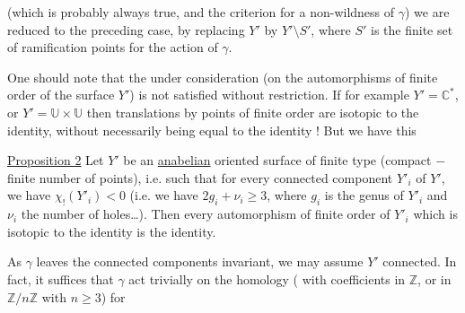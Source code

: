 (which is probably always true, and  the criterion for a non-wildness of $\gamma$) we are reduced to the preceding case, by  replacing $Y'$ by $Y'\setminus S'$, where $S'$ is the finite set of ramification points for the action of $\gamma$. 

One should note that the   under consideration  (on the automorphisms of finite order of the surface $Y'$) is not satisfied without restriction. If for example $Y'=\mathbb{C}^*$, or $Y'=\mathbb{U}\times\mathbb{U}$ then translations by points of finite order are isotopic to the identity, without necessarily being equal to the identity ! But we have this

\uline{Proposition 2} Let $Y'$ be an \uline{anabelian} oriented surface of finite type (compact  $-$ finite number of points), i.e. such that for every connected component $Y'_i$ of $Y'$, we have $\chi_!(Y'_i)<0$ (i.e. we have $2g_i+\nu_i\geq 3$, where $g_i$ is the genus of $Y'_i$ and $\nu_i$ the number of holes\ldots). Then every automorphism \inserted{$\gamma$} of finite order of $Y'_i$ which is isotopic to the identity is the identity.

As $\gamma$ leaves the connected components invariant, we may assume $Y'$ connected. In fact, it suffices that $\gamma$ act trivially on the homology  ( with coefficients in $\mathbb{Z}$, or in  $\mathbb{Z}/n\mathbb{Z}$ with $n\geq3$) for
